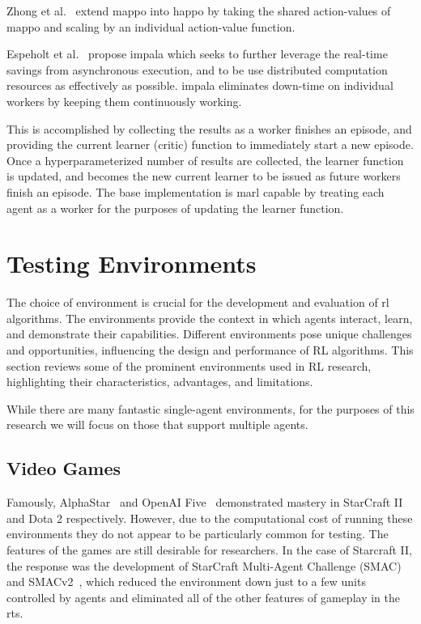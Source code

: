 Zhong et al.~\cite{zhong2024} extend \gls{mappo} 
into \gls{happo} by taking the shared action-values of 
\gls{mappo} and scaling by an individual action-value function.

Espeholt et al.~\cite{espeholt2018} propose \gls{impala} which seeks 
to further leverage the real-time savings from asynchronous execution, 
and to be use distributed computation resources as effectively as possible.
\Gls{impala} eliminates down-time on individual workers by keeping 
them continuously working.

This is accomplished by collecting the results as a worker finishes an
episode, and providing the current learner (critic) function
to immediately start a new episode. 
Once a hyperparameterized number of results are collected, 
the learner function is updated, and becomes the new current learner
to be issued as future workers finish an episode.
The base implementation is \gls{marl} capable by treating each agent
as a worker for the purposes of updating the learner function.

\section{Testing Environments}

The choice of environment is crucial for the development and evaluation 
of \gls{rl} algorithms. The environments provide the context in 
which agents interact, learn, and demonstrate their capabilities. 
Different environments pose unique challenges and opportunities, 
influencing the design and performance of RL algorithms. 
This section reviews some of the prominent environments used in 
RL research, highlighting their characteristics, advantages, and limitations.

While there are many fantastic single-agent environments, for the purposes 
of this research we will focus on those that support multiple agents.

    \subsection*{Video Games}

Famously, AlphaStar~\cite{vinyals2019} and OpenAI Five~\cite*{berner2019}
demonstrated mastery in StarCraft II and Dota 2 respectively.
However, due to the computational cost of running these environments
they do not appear to be particularly common for testing.
The features of the games are still desirable for researchers.
%
In the case of Starcraft II, the response was the development 
of StarCraft Multi-Agent Challenge (SMAC)~\cite{samvelyan2019} 
and SMACv2~\cite{ellis2023}, which reduced the 
environment down just to a few units controlled by agents and 
eliminated all of the other features of gameplay in the \gls{rts}.

